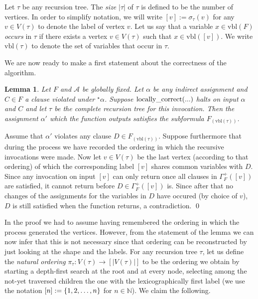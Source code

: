 \documentclass[11pt,a4paper]{article}
\newtheorem{lemma}[theorem]{Lemma}
\newcommand{\prbl}{\vspace*{0.2cm}}
\newcommand{\Function}[2]
	{ \mbox{\rm #1}(#2)}
\begin{document}
Let $\tau$ be any recursion tree. The \emph{size} $|\tau|$ of $\tau$ is defined to be the number of vertices.
In order to simplify notation, we will write $[v] := \sigma_\tau(v)$
for any $v \in V(\tau)$ to denote the label of vertex $v$. Let us say that a variable $x \in \mbox{vbl}(F)$
\emph{occurs} in $\tau$ if there exists a vertex $v \in V(\tau)$ such that $x \in \mbox{vbl}([v])$. We
write $\mbox{vbl}(\tau)$ to denote the set of variables that occur in $\tau$.

We are now ready to make a first statement about the correctness of the algorithm.

\begin{lemma}
\label{lemreccorr}
Let $F$ and $\mathcal{A}$ be globally fixed. Let $\alpha$ be any indirect assignment and $C \in F$ a clause
violated under $^\star \alpha$. Suppose $\Function{locally\_correct}{...}$ halts on input $\alpha$ and $C$
and let $\tau$ be the complete recursion tree for this invocation. 
Then the assignment $\alpha'$ which the function outputs satisfies the subformula $F_{(\mbox{vbl}(\tau))}$.
\end{lemma}

\proof Assume that $\alpha'$ violates any clause $D \in F_{(\mbox{vbl}(\tau))}$. Suppose furthermore
that during the process we have recorded the ordering in which the recursive invocations were made.
Now let $v \in V(\tau)$ be the last vertex (according to that ordering) of which the corresponding 
label $[v]$ shares common variables with $D$. Since any invocation on input $[v]$ can only return once 
all clauses in $\Gamma_F^+([v])$ are satisfied, it cannot return before $D \in \Gamma_F^+([v])$ is. 
Since after that no changes of the assignments for the variables in $D$ have occured (by choice of $v$), 
$D$ is still satisfied when the function returns, a contradiction. \qed
\prbl

In the proof we had to assume having remembered
the ordering in which the process generated the vertices. However, from the statement of the lemma we
can now infer that this is not necessary since that ordering can be reconstructed by just looking at
the shape and the labels. For any recursion tree $\tau$, let us define the \emph{natural ordering} 
$\pi_\tau : V(\tau) \rightarrow [|V(\tau)|]$ to be the ordering we obtain by starting a depth-first
search at the root and at every node, selecting among the not-yet traversed children the one with the 
lexicographically first label (we use the notation $[n] := \{1,2,\mathellipsis,n\}$ for $n \in \mathbb{N}$). 
We claim the following.
\end{document}
